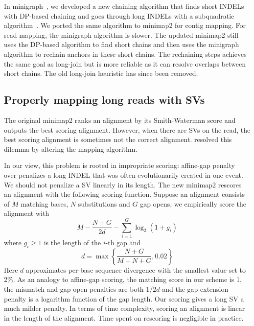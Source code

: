 \documentclass{bioinfo}
\begin{document}
\begin{methods}
In minigraph~\citep{Li:2020aa}, we developed a new chaining algorithm that
finds short INDELs with DP-based chaining and goes through long INDELs with a
subquadratic algorithm~\citep{DBLP:conf/wabi/AbouelhodaO03}. We ported the same
algorithm to minimap2 for contig mapping. For read mapping, the minigraph
algorithm is slower. The updated minimap2 still uses the DP-based algorithm to
find short chains and then uses the minigraph algorithm to rechain anchors in
these short chains. The rechaining steps achieves the same goal as long-join
but is more reliable as it can resolve overlaps between short chains. The old
long-join heuristic has since been removed.

\subsection{Properly mapping long reads with SVs}
The original minimap2 ranks an alignment by its Smith-Waterman score and
outputs the best scoring alignment. However, when there are SVs on the read,
the best scoring alignment is sometimes not the correct alignment.
\citet{Jain2020.11.01.363887} resolved this dilemma by altering the mapping
algorithm.

In our view, this problem is rooted in impropriate scoring: affine-gap penalty
over-penalizes a long INDEL that was often evolutionarily created in one event.
We should not penalize a SV linearly in its length. The new minimap2 rescores
an alignment with the following scoring function. Suppose an alignment consists
of $M$ matching bases, $N$ substitutions and $G$ gap opens, we empirically
score the alignment with
$$
M-\frac{N+G}{2d}-\sum_{i=1}^G\log_2(1+g_i)
$$
where $g_i\ge1$ is the length of the $i$-th gap and
$$
d=\max\left\{\frac{N+G}{M+N+G},0.02\right\}
$$
Here $d$ approximates per-base sequence divergence with the smallest value set
to 2\%. As an analogy to affine-gap scoring, the matching score in our scheme
is 1, the mismatch and gap open penalties are both $1/2d$ and the gap extension
penalty is a logarithm function of the gap length. Our scoring gives a long SV
a much milder penalty. In terms of time complexity, scoring an alignment is
linear in the length of the alignment. Time spent on rescoring is negligible in
practice.


\end{methods}
\end{document}
